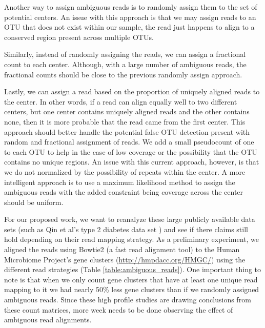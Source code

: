 Another way to assign ambiguous reads is to randomly assign them to the set of potential centers.
An issue with this approach is that we may assign reads to an OTU that does not exist within our sample, the read just happens to align to a conserved region present across multiple OTUs.

Similarly, instead of randomly assigning the reads, we can assign a fractional count to each center.  Although, with a large number of ambiguous reads, the fractional counts should be close to the previous randomly assign approach.

Lastly, we can assign a read based on the proportion of uniquely aligned reads to the center.  In other words, if a read can align equally well to two different centers, but one center contains uniquely aligned reads and the other contains none, then it is more probable that the read came from the first center.  This approach should better handle the potential false OTU detection present with random and fractional assignment of reads.
We add a small pseudocount of one to each OTU to help in the case of low coverage or the possibility that the OTU contains no unique regions.
An issue with this current approach, however, is that we do not normalized by the possibility of repeats within the center.
A more intelligent approach is to use a maximum likelihood method to assign the ambiguous reads with the added constraint being coverage across the center should be uniform\cite{patro2013sailfish}.

For our proposed work, we want to reanalyze these large publicly available data sets (such as Qin et al's type 2 diabetes data set \cite{qin_metagenome-wide_2012}) and see if there claims still hold depending on their read mapping strategy.
As a preliminary experiment, we aligned the reads using Bowtie2 (a fast read alignment tool)\cite{langmead2012fast} to the Human Microbiome Project's gene clusters (\url{http://hmpdacc.org/HMGC/}) using the different read strategies (Table \ref{table:ambiguous_reads}).
One important thing to note is that when we only count gene clusters that have at least one unique read mapping to it we had nearly 50\% less gene clusters than if we randomly assigned ambiguous reads.
Since these high profile studies are drawing conclusions from these count matrices, more week needs to be done observing the effect of ambiguous read alignments. 
